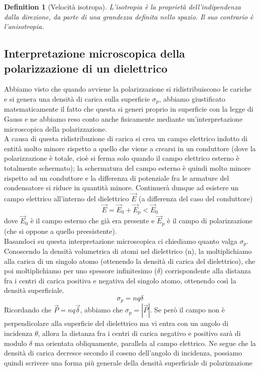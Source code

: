 \documentclass[10pt,a4paper]{article}
\newtheorem{definition}{Definition}
\begin{document}
\begin{definition}[Velocità isotropa]
	L'isotropia è la proprietà dell'indipendenza dalla direzione, da parte di una grandezza definita nello spazio. Il suo contrario è l'anisotropia.
\end{definition}
\subsection{Interpretazione microscopica della polarizzazione di un dielettrico}
Abbiamo visto che quando avviene la polarizzazione si ridistribuiscono le cariche e si genera una densità di carica sulla superficie \(\sigma_p\), abbiamo giustificato matematicamente il fatto che questa si generi proprio in superficie con la legge di Gauss e ne abbiamo reso conto anche fisicamente mediante un'interpretazione microscopica della polarizzazione.\\
A causa di questa ridistribuzione di carica si crea un campo elettrico indotto di entità molto minore rispetto a quello che viene a crearsi in un conduttore (dove la polarizzazione è totale, cioè si ferma solo quando il campo elettrico esterno è totalmente schermato); la schermatura del campo esterno è quindi molto minore rispetto ad un conduttore e la differenza di potenziale fra le armature del condensatore si riduce in quantità minore. Continuerà dunque ad esistere un campo elettrico all'interno del dielettrico $\vec{E}$ (a differenza del caso del conduttore)
\[\vec{E} = \vec{E}_0+\vec{E}_p<\vec{E}_0\]
dove $\vec{E}_0$ è il campo esterno che già era presente e $\vec{E}_p$ è il campo di polarizzazione (che si oppone a quello preesistente).\\
Basandoci su questa interpretazione microscopica ci chiediamo quanto valga $\sigma_p$. Conoscendo la densità volumetrica di atomi nel dielettrico (n), la moltiplichiamo alla carica di un singolo atomo (ottenendo la densità di carica del dielettrico), che poi moltiplichiamo per uno spessore infinitesimo (\(\delta\)) corrispondente alla distanza fra i centri di carica positiva e negativa del singolo atomo, ottenendo così la densità superficiale.
\[\sigma_p = n q \delta\]
Ricordando che \(\vec{P} = nq\vec{\delta}\), abbiamo che $\sigma_p = |\vec{P}|$. Se però il campo non è perpendicolare alla superficie del dielettrico ma vi entra con un angolo di incidenza $\theta$, allora la distanza fra i centri di carica negativo e positivo sarà di modulo $\delta$ ma orientata obliquamente, parallela al campo elettrico. Ne segue che la densità di carica decresce secondo il coseno dell'angolo di incidenza, possiamo quindi scrivere una forma più generale della densità superficiale di polarizzazione
\end{document}

